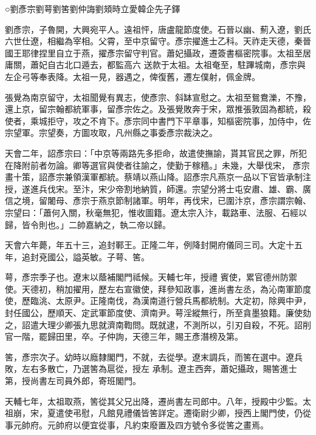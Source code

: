 
\begin{pinyinscope}

 ○劉彥宗劉萼劉筈劉仲誨劉頍時立愛韓企先子鐸



 劉彥宗，子魯開，大興宛平人。遠祖怦，唐盧龍節度使。石晉以幽、薊入遼，劉氏六世仕遼，相繼為宰相。父霄，至中京留守。彥宗擢進士乙科。天祚走天德，秦晉國王耶律捏里自立于燕，擢彥宗留守判官。蕭妃攝政，遷簽書樞密院事。太祖至居庸關，蕭妃自古北口遁去，都監高六
 送款于太祖。太祖奄至，駐蹕城南，彥宗與左企弓等奉表降。太祖一見，器遇之，俾復舊，遷左僕射，佩金牌。



 張覺為南京留守，太祖聞覺有異志，使彥宗、斜缽宣慰之。太祖至鴛鴦濼，不豫，還上京，留宗翰都統軍事，留彥宗佐之。及張覺敗奔于宋，眾推張敦固為都統，殺使者，乘城拒守，攻之不肯下。彥宗同中書門下平章事，知樞密院事，加侍中，佐宗望軍。宗望奏，方圖攻取，凡州縣之事委彥宗裁決之。



 天會二年，詔彥宗曰：「中京等兩路先多拒命，故遣使撫諭，貰其官民之罪，所犯在降附前者勿論。卿等選官與使者往諭之，使勤于稼穡。」未幾，大舉伐宋，
 彥宗畫十策，詔彥宗兼領漢軍都統。蔡靖以燕山降。詔彥宗凡燕京一品以下官皆承制注授，遂進兵伐宋。至汴，宋少帝割地納質，師還。宗望分將士屯安肅、雄、霸、廣信之境，留闍母、彥宗于燕京節制諸軍。明年，再伐宋，已圍汴京，彥宗謂宗翰、宗望曰：「蕭何入關，秋毫無犯，惟收圖籍。遼太宗入汴，載路車、法服、石經以歸，皆令則也。」二帥嘉納之，執二帝以歸。



 天會六年薨，年五十三，追封鄆王。正隆二年，例降封開府儀同三司。大定十五年，追封兗國公，謚英敏。子萼、筈。



 萼，彥宗季子也。遼末以蔭補閣門祗候。天輔七年，授禮
 賓使，累官德州防禦使。天德初，稍加擢用，歷左右宣徽使，拜參知政事，進尚書左丞，為沁南軍節度使，歷臨洮、太原尹。正隆南伐，為漢南道行營兵馬都統制。大定初，除興中尹，封任國公，歷順天、定武軍節度使、濟南尹。萼淫縱無行，所至貪墨狼籍。廉使劾之，詔遣大理少卿張九思就濟南鞫問。既就逮，不測所以，引刃自殺，不死。詔削官一階，罷歸田里，卒。子仲詢，天德三年，賜王彥潛榜及第。



 筈，彥宗次子。幼時以廕隸閣門，不就，去從學。遼末調兵，而筈在選中。遼兵敗，左右多散亡，乃選筈為扈從，授左
 承制。遼主西奔，蕭妃攝政，賜筈進士第，授尚書左司員外郎，寄班閣門。



 天輔七年，太祖取燕，筈從其父兄出降，遷尚書左司郎中。八年，授殿中少監。太祖崩，宋，夏遣使弔慰，凡館見禮儀皆筈詳定。遷衛尉少卿，授西上閣門使，仍從事元帥府。元帥府以便宜從事，凡約束廢置及四方號令多從筈之畫焉。




\end{pinyinscope}
